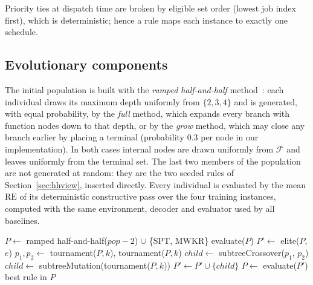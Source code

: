 \documentclass[review,authoryear,11pt]{elsarticle}
\newcommand{\RE}{\mathrm{RE}}
\begin{document}
Priority ties at dispatch time are broken by eligible
set order (lowest job index first), which is deterministic; hence a rule
maps each instance to exactly one schedule.



\subsection{Evolutionary components}
\label{sec:evoview}
The initial population is built with the \emph{ramped half-and-half}
method~\citep{Koza1992,Poli2008}: each individual draws its maximum
depth uniformly from $\{2,3,4\}$ and is generated, with equal
probability, by the \emph{full} method, which expands every branch with
function nodes down to that depth, or by the \emph{grow} method, which
may close any branch earlier by placing a terminal (probability $0.3$
per node in our implementation). In both cases internal nodes are drawn
uniformly from $\mathcal{F}$ and leaves uniformly from the terminal
set. The last two members of the
population are not generated at random: they are the two seeded rules
of Section~\ref{sec:hhview}, inserted directly.
Every individual is evaluated by the mean $\RE$ of its
deterministic constructive pass over the four training instances,
computed with the same environment, decoder and evaluator used by all
baselines.

\begin{algorithm}[t]
\caption{GP hyper-heuristic for the IJSP}
\label{alg:gp}
\begin{algorithmic}[1]
\State $P \gets$ ramped half-and-half($\mathit{pop}-2$) $\cup$ \{SPT, MWKR\}
\State evaluate($P$) 
  \State $P' \gets$ elite($P$, $e$) 
      \State $p_1, p_2 \gets$ tournament($P,k$), tournament($P,k$)
      \State $\mathit{child} \gets$ subtreeCrossover($p_1$, $p_2$)
    \Else
      \State $\mathit{child} \gets$ subtreeMutation(tournament($P,k$))
    \EndIf
    \State $P' \gets P' \cup \{\mathit{child}\}$ 
  \EndWhile
  \State $P \gets$ evaluate($P'$)
\EndFor
\State \Return best rule in $P$
\end{algorithmic}
\end{algorithm}
\end{document}
